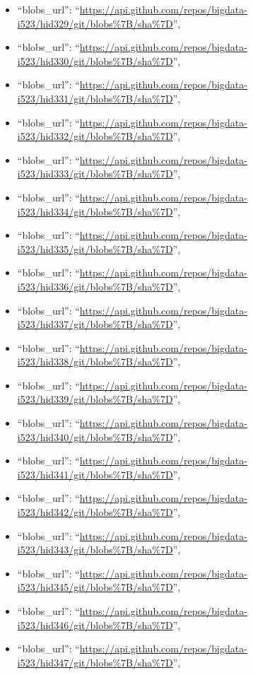 \begin{itemize}
\item
  ``blobs\_url'':
  ``\url{https://api.github.com/repos/bigdata-i523/hid329/git/blobs\%7B/sha\%7D}'',
\item
  ``blobs\_url'':
  ``\url{https://api.github.com/repos/bigdata-i523/hid330/git/blobs\%7B/sha\%7D}'',
\item
  ``blobs\_url'':
  ``\url{https://api.github.com/repos/bigdata-i523/hid331/git/blobs\%7B/sha\%7D}'',
\item
  ``blobs\_url'':
  ``\url{https://api.github.com/repos/bigdata-i523/hid332/git/blobs\%7B/sha\%7D}'',
\item
  ``blobs\_url'':
  ``\url{https://api.github.com/repos/bigdata-i523/hid333/git/blobs\%7B/sha\%7D}'',
\item
  ``blobs\_url'':
  ``\url{https://api.github.com/repos/bigdata-i523/hid334/git/blobs\%7B/sha\%7D}'',
\item
  ``blobs\_url'':
  ``\url{https://api.github.com/repos/bigdata-i523/hid335/git/blobs\%7B/sha\%7D}'',
\item
  ``blobs\_url'':
  ``\url{https://api.github.com/repos/bigdata-i523/hid336/git/blobs\%7B/sha\%7D}'',
\item
  ``blobs\_url'':
  ``\url{https://api.github.com/repos/bigdata-i523/hid337/git/blobs\%7B/sha\%7D}'',
\item
  ``blobs\_url'':
  ``\url{https://api.github.com/repos/bigdata-i523/hid338/git/blobs\%7B/sha\%7D}'',
\item
  ``blobs\_url'':
  ``\url{https://api.github.com/repos/bigdata-i523/hid339/git/blobs\%7B/sha\%7D}'',
\item
  ``blobs\_url'':
  ``\url{https://api.github.com/repos/bigdata-i523/hid340/git/blobs\%7B/sha\%7D}'',
\item
  ``blobs\_url'':
  ``\url{https://api.github.com/repos/bigdata-i523/hid341/git/blobs\%7B/sha\%7D}'',
\item
  ``blobs\_url'':
  ``\url{https://api.github.com/repos/bigdata-i523/hid342/git/blobs\%7B/sha\%7D}'',
\item
  ``blobs\_url'':
  ``\url{https://api.github.com/repos/bigdata-i523/hid343/git/blobs\%7B/sha\%7D}'',
\item
  ``blobs\_url'':
  ``\url{https://api.github.com/repos/bigdata-i523/hid345/git/blobs\%7B/sha\%7D}'',
\item
  ``blobs\_url'':
  ``\url{https://api.github.com/repos/bigdata-i523/hid346/git/blobs\%7B/sha\%7D}'',
\item
  ``blobs\_url'':
  ``\url{https://api.github.com/repos/bigdata-i523/hid347/git/blobs\%7B/sha\%7D}'',

\end{itemize}
